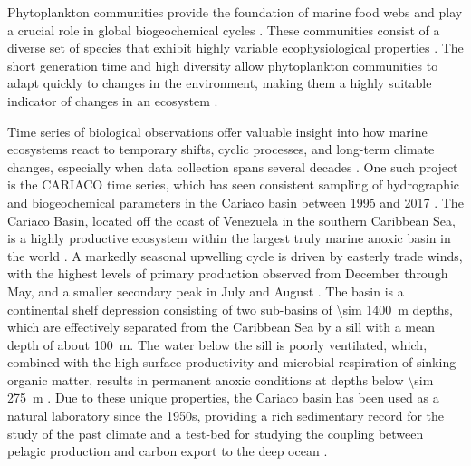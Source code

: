 \documentclass[draft]{agujournal2019}
\begin{document}
    Phytoplankton communities provide the foundation of marine food webs and play a crucial role in global biogeochemical cycles \cite{falkowski_biogeochemical_1998}. These communities consist of a diverse set of species that exhibit highly variable ecophysiological properties \cite{appeltans_magnitude_2012}. The short generation time and high diversity allow phytoplankton communities to adapt quickly to changes in the environment, making them a highly suitable indicator of changes in an ecosystem \cite{alvarez-cobelas_what_1998, di_cavalho_temporal_2023}.

    
    Time series of biological observations offer valuable insight into how marine ecosystems react to temporary shifts, cyclic processes, and long-term climate changes, especially when data collection spans several decades \cite{carstensen_need_2014, henson_observing_2016}. 
    One such project is the CARIACO time series, which has seen consistent sampling of hydrographic and biogeochemical parameters in the Cariaco basin between 1995 and 2017 \cite{muller-karger_scientific_2019}. 
    The Cariaco Basin, located off the coast of Venezuela in the southern Caribbean Sea, is a highly productive ecosystem within the largest truly marine anoxic basin in the world \cite{edgcomb_accessing_2011}. A markedly seasonal upwelling cycle is driven by easterly trade winds, with the highest levels of primary production observed from December through May, and a smaller secondary peak in July and August \cite{mullerkarger_annual_2001, astor_seasonal_2003}. The basin is a continental shelf depression consisting of two sub-basins of \qty{\sim 1400}{m} depths, which are effectively separated from the Caribbean Sea by a sill with a mean depth of about \qty{100}{m}. The water below the sill is poorly ventilated, which, combined with the high surface productivity and microbial respiration of sinking organic matter, results in permanent anoxic conditions at depths below \qty{\sim 275}{m} \cite{thunell_organic_2000}. Due to these unique properties, the Cariaco basin has been used as a natural laboratory since the 1950s, providing a rich sedimentary record for the study of the past climate \cite{hughen1996nature} and a test-bed for studying the coupling between pelagic production and carbon export to the deep ocean \cite{montes_vertical_2012}.

    
\end{document}
